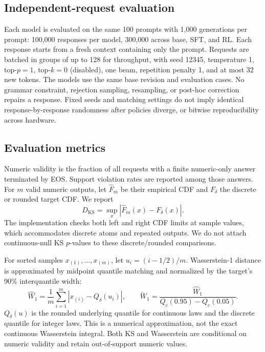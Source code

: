 \documentclass[11pt,letterpaper]{article}
\newcommand{\nW}{\widetilde W_1}
\begin{document}
\subsection{Independent-request evaluation}
Each model is evaluated on the same 100 prompts with 1,000 generations per
prompt: 100,000 responses per model, 300,000 across base, SFT, and RL. Each
response starts from a fresh context containing only the prompt. Requests
are batched in groups of up to 128 for throughput, with seed 12345,
temperature 1, top-$p=1$, top-$k=0$ (disabled), one beam, repetition penalty
1, and at most 32 new tokens. The models use the same base revision and
evaluation cases. No grammar constraint, rejection sampling, resampling, or
post-hoc correction repairs a response. Fixed seeds and matching settings
do not imply identical response-by-response randomness after policies diverge,
or bitwise reproducibility across hardware.

\subsection{Evaluation metrics}
Numeric validity is the fraction of all requests with a finite numeric-only
answer terminated by EOS. Support violation rates are reported among those
answers. For $m$ valid numeric outputs, let $\widehat F_m$ be their empirical
CDF and $F_\delta$ the discrete or rounded target CDF. We report
\begin{equation}
 D_{\mathrm{KS}}=\sup_x|\widehat F_m(x)-F_\delta(x)|.
 \label{eq:ks}
\end{equation}
The implementation checks both left and right CDF limits at sample values,
which accommodates discrete atoms and repeated outputs. We do not attach
continuous-null KS $p$-values to these discrete/rounded comparisons.

For sorted samples $x_{(1)},\ldots,x_{(m)}$, let $u_i=(i-1/2)/m$.
Wasserstein-1 distance is approximated by midpoint quantile matching and
normalized by the target's 90\% interquantile width:
\begin{equation}
 \widehat W_1=\frac1m\sum_{i=1}^m
 |x_{(i)}-Q_\delta(u_i)|,
 \qquad
 \nW=\frac{\widehat W_1}{Q_c(0.95)-Q_c(0.05)}.
 \label{eq:wasserstein}
\end{equation}
$Q_\delta(u)$ is the rounded underlying quantile for continuous laws and the
discrete quantile for integer laws. This is a numerical approximation, not
the exact continuous Wasserstein integral. Both KS and Wasserstein are
conditional on numeric validity and retain out-of-support numeric values.
\end{document}
